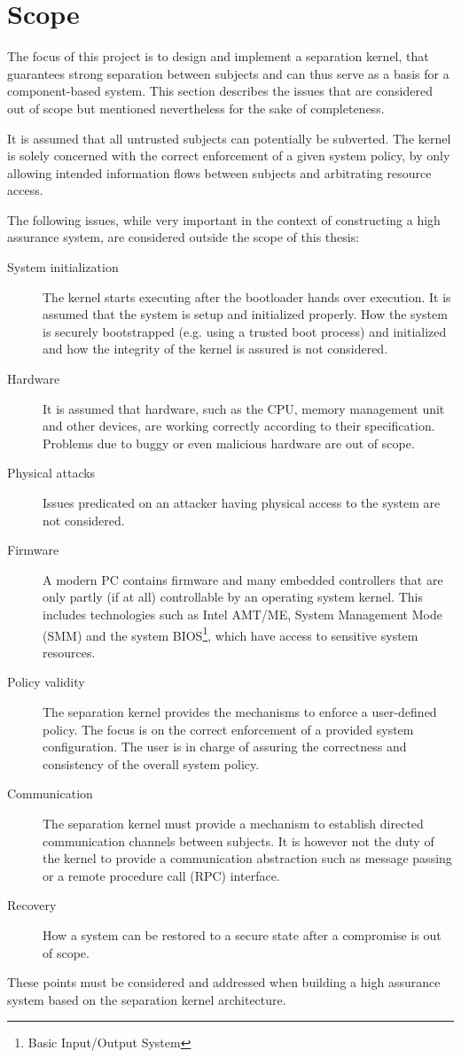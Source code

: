 \section{Scope}
The focus of this project is to design and implement a separation kernel, that
guarantees strong separation between subjects and can thus serve as a basis for
a component-based system. This section describes the issues that are considered
out of scope but mentioned nevertheless for the sake of completeness.

It is assumed that all untrusted subjects can potentially be subverted. The
kernel is solely concerned with the correct enforcement of a given system
policy, by only allowing intended information flows between subjects and
arbitrating resource access.

The following issues, while very important in the context of constructing a
high assurance system, are considered outside the scope of this thesis:

\begin{description}
	\item[System initialization] The kernel starts executing after the
		bootloader hands over execution. It is assumed that the system is setup
		and initialized properly. How the system is securely bootstrapped (e.g.
		using a trusted boot process) and initialized and how the integrity of
		the kernel is assured is not considered.
	\item[Hardware] It is assumed that hardware, such as the CPU, memory
		management unit and other devices, are working correctly according to
		their specification. Problems due to buggy or even malicious hardware
		are out of scope.
	\item[Physical attacks] Issues predicated on an attacker having physical
		access to the system are not considered.
	\item[Firmware] A modern PC contains firmware and many embedded controllers
		that are only partly (if at all) controllable by an operating system
		kernel. This includes technologies such as Intel AMT/ME, System
		Management Mode (SMM) and the system BIOS\footnote{Basic
		Input/Output System}, which have access to sensitive system resources.
	\item[Policy validity] The separation kernel provides the mechanisms to
		enforce a user-defined policy. The focus is on the correct enforcement
		of a provided system configuration. The user is in charge of assuring
		the correctness and consistency of the overall system policy.
	\item[Communication] The separation kernel must provide a mechanism to
		establish directed communication channels between subjects.	It is
		however not the duty of the kernel to provide a	communication
		abstraction such as message passing or a remote procedure call (RPC)
		interface.
	\item[Recovery] How a system can be restored to a secure state after a
		compromise is out of scope.
\end{description}

These points must be considered and addressed when building a high assurance
system based on the separation kernel architecture.
